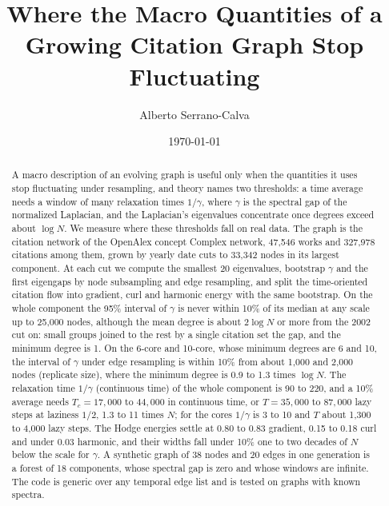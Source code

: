 \documentclass[11pt]{article}
\title{Where the Macro Quantities of a Growing Citation Graph Stop Fluctuating}
\author{Alberto Serrano-Calva}
\date{\today}
\begin{document}
\maketitle

\begin{abstract}
A macro description of an evolving graph is useful only when the quantities it uses stop fluctuating
under resampling, and theory names two thresholds: a time average needs a window of many relaxation
times $1/\gamma$, where $\gamma$ is the spectral gap of the normalized Laplacian, and the Laplacian's
eigenvalues concentrate once degrees exceed about $\log N$. We measure where these thresholds fall
on real data. The graph is the citation network of the OpenAlex concept Complex network, 47,546
works and 327,978 citations among them, grown by yearly date cuts to 33,342 nodes in its
largest component. At each cut we compute the smallest 20 eigenvalues, bootstrap $\gamma$ and the
first eigengaps by node subsampling and edge resampling, and split the time-oriented citation flow
into gradient, curl and harmonic energy with the same bootstrap. On the whole component the 95\%
interval of $\gamma$ is never within 10\% of its median at any scale up to 25,000 nodes, although
the mean degree is about $2\log N$ or more from the 2002 cut on: small groups joined to the rest by a single
citation set the gap, and the minimum degree is 1. On the 6-core and 10-core, whose minimum degrees
are 6 and 10, the interval of $\gamma$ under edge resampling is within 10\% from about 1,000 and
2,000 nodes (replicate size), where the minimum degree is 0.9 to 1.3 times $\log N$. The relaxation time $1/\gamma$ (continuous time) of the
whole component is 90 to 220, and a 10\% average needs $T_c = 17{,}000$ to $44{,}000$ in continuous time, or $T = 35{,}000$ to $87{,}000$ lazy steps at laziness $1/2$,
1.3 to 11 times $N$; for the cores $1/\gamma$ is 3 to 10 and $T$ about 1,300 to 4,000 lazy steps. The Hodge energies settle at 0.80 to
0.83 gradient, 0.15 to 0.18 curl and under 0.03 harmonic, and their widths fall under 10\% one to
two decades of $N$ below the scale for $\gamma$. A synthetic graph of 38 nodes and 20 edges in one generation is a forest
of 18 components, whose spectral gap is zero and whose windows are infinite. The code is generic over
any temporal edge list and is tested on graphs with known spectra.
\end{abstract}
\end{document}

